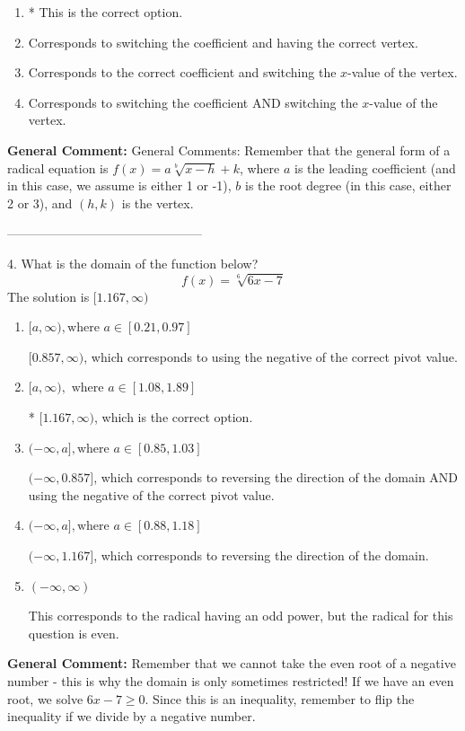 \documentclass{extbook}[14pt]
\begin{document}
\begin{enumerate}[label=\Alph*.] 
\item * This is the correct option.  
\item Corresponds to switching the coefficient and having the correct vertex.  
\item Corresponds to the correct coefficient and switching the $x$-value of the vertex.  
\item Corresponds to switching the coefficient AND switching the $x$-value of the vertex.  
\end{enumerate} 
 
\textbf{General Comment:} General Comments: Remember that the general form of a radical equation is $ f(x) = a \sqrt[b]{x - h} + k $, where $a$ is the leading coefficient (and in this case, we assume is either 1 or -1), $b$ is the root degree (in this case, either 2 or 3), and $(h, k)$ is the vertex. 

-----------------------------------------------

4. What is the domain of the function below?
\[ f(x) = \sqrt[6]{6 x - 7} \] 
The solution is $ [1.167, \infty) $ 

\begin{enumerate}[label=\Alph*.] 
\item $ [a, \infty), \text{where } a \in [0.21, 0.97] $ 

 $[0.857, \infty)$, which corresponds to using the negative of the correct pivot value. 
\item $ [a, \infty), \text{ where } a \in [1.08, 1.89] $ 

 * $[1.167, \infty)$, which is the correct option. 
\item $ (-\infty, a], \text{where } a \in [0.85, 1.03] $ 

 $(-\infty, 0.857]$, which corresponds to reversing the direction of the domain AND using the negative of the correct pivot value. 
\item $ (-\infty, a], \text{where } a \in [0.88, 1.18] $ 

  $(-\infty, 1.167]$, which corresponds to reversing the direction of the domain. 
\item $ (-\infty, \infty) $ 

 This corresponds to the radical having an odd power, but the radical for this question is even. 
\end{enumerate} 
 
\textbf{General Comment:} Remember that we cannot take the even root of a negative number - this is why the domain is only sometimes restricted! If we have an even root, we solve $6 x - 7 \geq 0$. Since this is an inequality, remember to flip the inequality if we divide by a negative number. 
\end{document}
